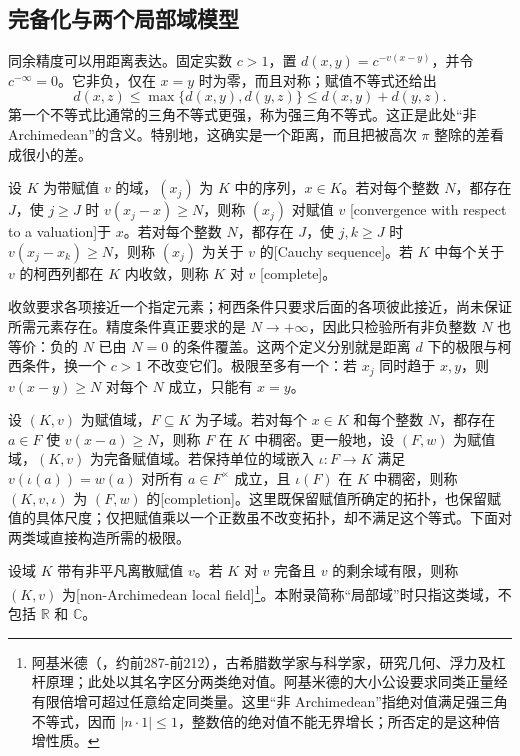 \subsection{完备化与两个局部域模型}
\label{b1:subsec:D01:02}

同余精度可以用距离表达。固定实数 \(c>1\)，置 \(d(x,y)=c^{-v(x-y)}\)，并令 \(c^{-\infty}=0\)。它非负，仅在 \(x=y\) 时为零，而且对称；赋值不等式还给出
\[
	d(x,z)\leq\max\{d(x,y),d(y,z)\}\leq d(x,y)+d(y,z).
\]
第一个不等式比通常的三角不等式更强，称为强三角不等式。这正是此处“非 Archimedean”的含义。特别地，这确实是一个距离，而且把被高次 \(\pi\) 整除的差看成很小的差。

\begin{definition}\label{b1:def:valuation-completeness}
	设 \(K\) 为带赋值 \(v\) 的域，\((x_j)\) 为 \(K\) 中的序列，\(x\in K\)。若对每个整数 \(N\)，都存在 \(J\)，使 \(j\geq J\) 时 \(v(x_j-x)\geq N\)，则称 \((x_j)\) 对赋值 \(v\) [convergence with respect to a valuation]于 \(x\)。若对每个整数 \(N\)，都存在 \(J\)，使 \(j,k\geq J\) 时 \(v(x_j-x_k)\geq N\)，则称 \((x_j)\) 为关于 \(v\) 的[Cauchy sequence]。若 \(K\) 中每个关于 \(v\) 的柯西列都在 \(K\) 内收敛，则称 \(K\) 对 \(v\) [complete]。
\end{definition}

收敛要求各项接近一个指定元素；柯西条件只要求后面的各项彼此接近，尚未保证所需元素存在。精度条件真正要求的是 \(N\to+\infty\)，因此只检验所有非负整数 \(N\) 也等价：负的 \(N\) 已由 \(N=0\) 的条件覆盖。这两个定义分别就是距离 \(d\) 下的极限与柯西条件，换一个 \(c>1\) 不改变它们。极限至多有一个：若 \(x_j\) 同时趋于 \(x,y\)，则 \(v(x-y)\geq N\) 对每个 \(N\) 成立，只能有 \(x=y\)。

\ProseParagraphBreak
设 \((K,v)\) 为赋值域，\(F\subseteq K\) 为子域。若对每个 \(x\in K\) 和每个整数 \(N\)，都存在 \(a\in F\) 使 \(v(x-a)\geq N\)，则称 \(F\) 在 \(K\) 中稠密。更一般地，设 \((F,w)\) 为赋值域，\((K,v)\) 为完备赋值域。若保持单位的域嵌入 \(\iota:F\rightarrow K\) 满足 \(v(\iota(a))=w(a)\) 对所有 \(a\in F^\times\) 成立，且 \(\iota(F)\) 在 \(K\) 中稠密，则称 \((K,v,\iota)\) 为 \((F,w)\) 的[completion]。这里既保留赋值所确定的拓扑，也保留赋值的具体尺度；仅把赋值乘以一个正数虽不改变拓扑，却不满足这个等式。下面对两类域直接构造所需的极限。

\begin{definition}\label{b1:def:nonarchimedean-local-field}
	设域 \(K\) 带有非平凡离散赋值 \(v\)。若 \(K\) 对 \(v\) 完备且 \(v\) 的剩余域有限，则称 \((K,v)\) 为[non-Archimedean local field]\footnote{阿基米德（，约前287-前212），古希腊数学家与科学家，研究几何、浮力及杠杆原理；此处以其名字区分两类绝对值。阿基米德的大小公设要求同类正量经有限倍增可超过任意给定同类量。这里“非 Archimedean”指绝对值满足强三角不等式，因而 \(|n\cdot1|\leq1\)，整数倍的绝对值不能无界增长；所否定的是这种倍增性质。}。本附录简称“局部域”时只指这类域，不包括 \(\mathbb R\) 和 \(\mathbb C\)。
\end{definition}

